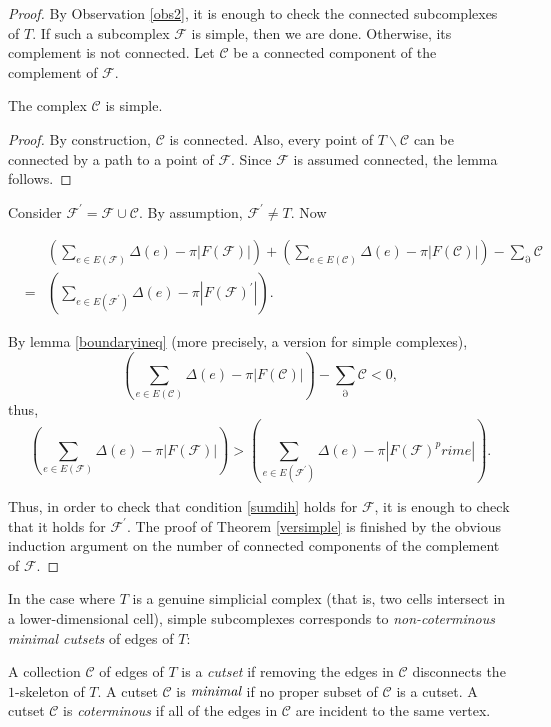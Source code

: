 \documentclass{acmart}
\newcommand{\thm}[2]{\begin{#1} #2 \end{#1}}
\begin{document}
\thm{proof}
{
By Observation \ref{obs2}, it is enough to check the connected
subcomplexes of $T$. If such a subcomplex $\mathcal{F}$ is
simple, then we are done. Otherwise, its complement is not
connected. Let $\mathcal{C}$ be a connected component of the
complement of $\mathcal{F}$.
\thm{lemma}
{
The complex $\mathcal{C}$ is simple.
}

\thm{proof}
{
By construction, $\mathcal{C}$ is connected. Also, every point of 
$T \backslash \mathcal{C}$ can be connected by a path to a point of
$\mathcal{F}$. Since $\mathcal{F}$ is assumed connected, the lemma
follows. 
}

Consider $\mathcal{F}^\prime = \mathcal{F} \cup \mathcal{C}$. By
assumption, $\mathcal{F}^\prime \neq T.$ Now

\begin{eqnarray}
 & & \left(\sum_{e\in E(\mathcal{F})} \Delta(e) -  \pi
  |F(\mathcal{F})|\right) +
\left(\sum_{e\in E(\mathcal{C})} \Delta(e) -  \pi
  |F(\mathcal{C})|\right) - \sum_\partial \mathcal{C} \\
 & = &
\left(\sum_{e\in E(\mathcal{F}^\prime)} \Delta(e) -  \pi
  |F(\mathcal{F})^\prime|\right).
\end{eqnarray}

By lemma \ref{boundaryineq} (more precisely, a version for simple
complexes), 
\begin{equation}
\left(\sum_{e\in E(\mathcal{C})} \Delta(e) -  \pi
  |F(\mathcal{C})|\right) - \sum_\partial \mathcal{C} < 0, 
\end{equation}
thus,
\begin{equation}
\left(\sum_{e\in E(\mathcal{F})} \Delta(e) -  \pi
  |F(\mathcal{F})|\right) > 
\left(\sum_{e\in E(\mathcal{F}^\prime)} \Delta(e) -  \pi
  |F(\mathcal{F})^prime|\right).
\end{equation}

Thus, in order to check that condition \ref{sumdih} holds for
$\mathcal{F}$, it is enough to check that it holds for
$\mathcal{F}^\prime$. The proof of Theorem \ref{versimple} is finished
by the obvious induction 
argument on the number of connected components of the complement of
$\mathcal{F}$. 
}

In the case where  $T$ is a genuine simplicial complex (that is, two
cells intersect in a lower-dimensional cell), simple subcomplexes
corresponds to \emph{non-coterminous minimal cutsets} of edges of $T$:

\thm{definition}
{
A collection $\mathcal{C}$ of edges of $T$ is a \emph{cutset} if
removing the edges in $\mathcal{C}$ disconnects the $1$-skeleton of
$T$. A cutset $\mathcal{C}$ is $\emph{minimal}$ if no proper subset of
$\mathcal{C}$ 
is a cutset. A cutset $\mathcal{C}$ is \emph{coterminous} if all of
the edges in $\mathcal{C}$ are incident to the same vertex.
}
\end{document}
